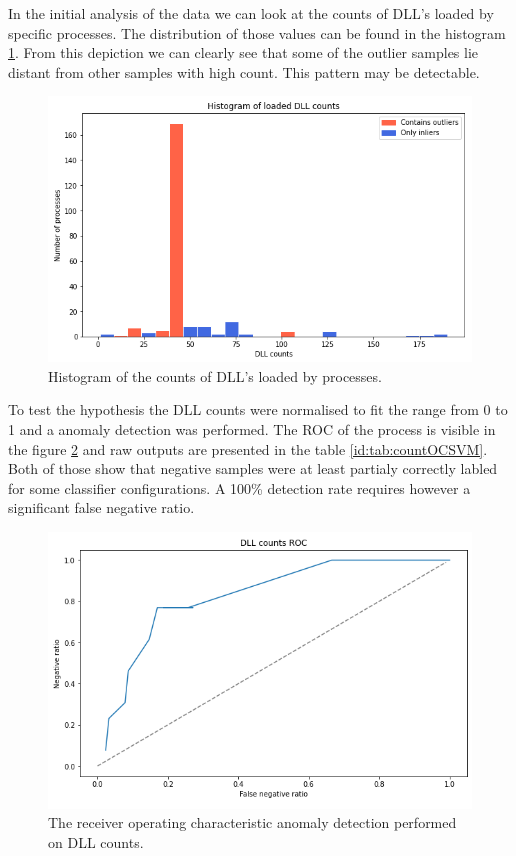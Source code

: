 \documentclass[a4paper,twoside,12pt]{book}
\begin{document}
In the initial analysis of the data we can look at the counts of DLL's loaded by specific 
processes. The distribution of those values can be found in the histogram \ref{fig:dllCounts}. 
From this depiction we can clearly see that some of the outlier samples lie distant from other 
samples with high count. This pattern may be detectable. 


\begin{figure}
	\centering
	\includegraphics[scale=0.9]{images/DLLcounts}
	\caption{Histogram of the counts of DLL's loaded by processes.}
	\label{fig:dllCounts}
 \end{figure}

To test the hypothesis the DLL counts were normalised to fit the range from 0 to 1 and a anomaly 
detection was performed. The ROC of the process is visible in the figure \ref{fig:DLLcountsROC} and
raw outputs are presented in the table \ref{id:tab:countOCSVM}. Both of those show that 
negative samples were at least partialy correctly labled for some classifier configurations. A 100\%
detection rate requires however a significant false negative ratio.

\begin{figure}
	\centering
	\includegraphics{images/DLLCountsROCKF}
	\caption{The receiver operating characteristic anomaly detection performed on DLL counts.}
	\label{fig:DLLcountsROC}
\end{figure}
\end{document}
